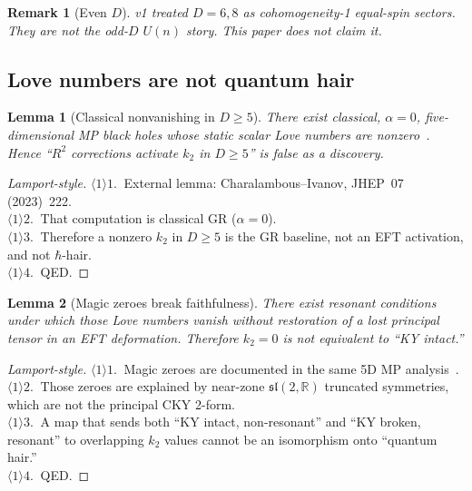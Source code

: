\documentclass[11pt,a4paper]{article}
\newtheorem{lemma}{Lemma}[section]
\newtheorem{remark}{Remark}[section]
\begin{document}
\begin{remark}[Even \(D\)]
v1 treated \(D=6,8\) as cohomogeneity-1 equal-spin sectors. They are
not the odd-\(D\) \(U(n)\) story. This paper does not claim it.
\end{remark}

\subsection{Love numbers are not quantum hair}

\begin{lemma}[Classical nonvanishing in \(D\ge5\)]
\label{lem:k2}
There exist classical, \(\alpha=0\), five-dimensional MP black holes
whose static scalar Love numbers are nonzero~\cite{CharalambousIvanov2023}.
Hence ``\(R^2\) corrections activate \(k_2\) in \(D\ge5\)'' is false as
a discovery.
\end{lemma}

\begin{proof}[Lamport-style]
\(\langle1\rangle1.\ \) External lemma: Charalambous--Ivanov, JHEP~07
(2023)~222.\\
\(\langle1\rangle2.\ \) That computation is classical GR
(\(\alpha=0\)).\\
\(\langle1\rangle3.\ \) Therefore a nonzero \(k_2\) in \(D\ge5\) is the
GR baseline, not an EFT activation, and not \(\hbar\)-hair.\\
\(\langle1\rangle4.\ \) QED.
\end{proof}

\begin{lemma}[Magic zeroes break faithfulness]
\label{lem:magic}
There exist resonant conditions under which those Love numbers vanish
without restoration of a lost principal tensor in an EFT deformation.
Therefore \(k_2=0\) is not equivalent to ``KY intact.''
\end{lemma}

\begin{proof}[Lamport-style]
\(\langle1\rangle1.\ \) Magic zeroes are documented in the same 5D MP
analysis~\cite{CharalambousIvanov2023}.\\
\(\langle1\rangle2.\ \) Those zeroes are explained by near-zone
\(\mathfrak{sl}(2,\mathbb{R})\) truncated symmetries, which are not the
principal CKY 2-form.\\
\(\langle1\rangle3.\ \) A map that sends both ``KY intact, non-resonant''
and ``KY broken, resonant'' to overlapping \(k_2\) values cannot be an
isomorphism onto ``quantum hair.''\\
\(\langle1\rangle4.\ \) QED.
\end{proof}
\end{document}
